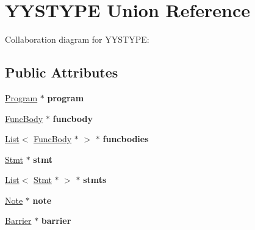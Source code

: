 \hypertarget{union_y_y_s_t_y_p_e}{}\section{Y\+Y\+S\+T\+Y\+PE Union Reference}
\label{union_y_y_s_t_y_p_e}


Collaboration diagram for Y\+Y\+S\+T\+Y\+PE\+:
\subsection*{Public Attributes}
\begin{DoxyCompactItemize}
\item 
\mbox{\label{union_y_y_s_t_y_p_e_a34b561a145f5c80b0551d8cc4d31cfec}} 
\hyperlink{class_program}{Program} $\ast$ {\bfseries program}
\item 
\mbox{\label{union_y_y_s_t_y_p_e_a9eb40cdf940829b1c77841a2930308e3}} 
\hyperlink{class_func_body}{Func\+Body} $\ast$ {\bfseries funcbody}
\item 
\mbox{\label{union_y_y_s_t_y_p_e_a3b25fcf1637c9c662286960d65b49efa}} 
\hyperlink{class_list}{List}$<$ \hyperlink{class_func_body}{Func\+Body} $\ast$ $>$ $\ast$ {\bfseries funcbodies}
\item 
\mbox{\label{union_y_y_s_t_y_p_e_ac5c4689dcc0b0451ff590c3af7cae0ce}} 
\hyperlink{class_stmt}{Stmt} $\ast$ {\bfseries stmt}
\item 
\mbox{\label{union_y_y_s_t_y_p_e_ad31f8bb77e75fb2b912449706652dacb}} 
\hyperlink{class_list}{List}$<$ \hyperlink{class_stmt}{Stmt} $\ast$ $>$ $\ast$ {\bfseries stmts}
\item 
\mbox{\label{union_y_y_s_t_y_p_e_a860c48648df0cd1f69a660d306525bcb}} 
\hyperlink{class_note}{Note} $\ast$ {\bfseries note}
\item 
\mbox{\label{union_y_y_s_t_y_p_e_a94763e31051662fe9ddb6b4834906dd0}} 
\hyperlink{class_barrier}{Barrier} $\ast$ {\bfseries barrier}
\item 
\mbox{\label{union_y_y_s_t_y_p_e_a097881ce8c5b9874d27b78b1918a0097}} 

\end{DoxyCompactItemize}
